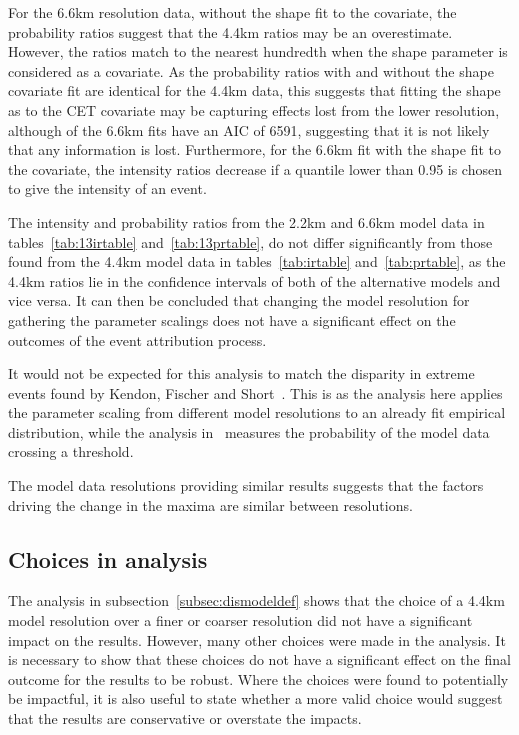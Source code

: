 For the 6.6km resolution data,
    without the shape fit to the covariate,
    the probability ratios suggest that the 4.4km ratios may be an overestimate.
However,
    the ratios match to the nearest hundredth when the shape parameter is considered as a covariate.
As the probability ratios with and without the shape covariate fit are identical for the 4.4km data,
    this suggests that fitting the shape as to the CET covariate may be capturing effects lost from the lower resolution,
    although of the 6.6km fits have an AIC of 6591, suggesting that it is not likely that any information is lost.
Furthermore, for the 6.6km fit with the shape fit to the covariate,
    the intensity ratios decrease if a quantile lower than 0.95 is chosen to give the intensity of an event.

The intensity and probability ratios from the 2.2km and 6.6km model data in tables~\ref{tab:13irtable} and~\ref{tab:13prtable},
    do not differ significantly from those found from the 4.4km model data in tables~\ref{tab:irtable} and~\ref{tab:prtable},
    as the 4.4km ratios lie in the confidence intervals of both of the alternative models and vice versa.
It can then be concluded that changing the model resolution for gathering the parameter scalings does not have a significant effect
     on the outcomes of the event attribution process.

It would not be expected for this analysis to match the disparity in extreme events found by Kendon, Fischer and Short~\cite{Kendon_Fischer_Short_2023}.
This is as the analysis here applies the parameter scaling from different model resolutions to an already fit empirical distribution,
    while the analysis in~\cite{Kendon_Fischer_Short_2023} measures the probability of the model data crossing a threshold.

The model data resolutions providing similar results suggests that the factors driving the change in the maxima are similar between resolutions.

\subsection{Choices in analysis}\label{subsec:diseventdef}

The analysis in subsection~\ref{subsec:dismodeldef} shows that the choice of a 4.4km model resolution over a finer or coarser resolution
    did not have a significant impact on the results.
However,
    many other choices were made in the analysis.
It is necessary to show that these choices do not have a significant effect on the final outcome for the results to be robust.
Where the choices were found to potentially be impactful,
    it is also useful to state whether a more valid choice would suggest that the results are conservative or overstate the impacts.

